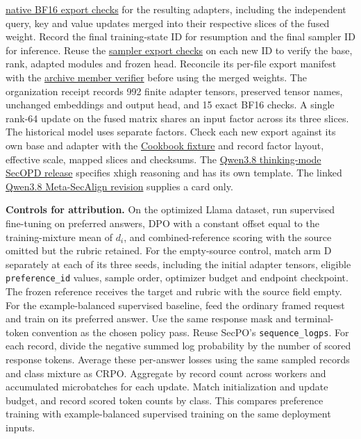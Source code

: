 \documentclass[11pt]{article}
\begin{document}
\href{https://huggingface.co/promptinjections/Qwen3.8-27B-SecPO-lr8e-5/blob/24d2b8a7b2166c607d4f1e0f1e13bbf8a9d555d7/merge_validation.json}{native BF16 export checks} for the resulting adapters, including the independent query, key and value updates merged into their respective slices of the fused weight. Record the final training-state ID for resumption and the final sampler ID for inference. Reuse the \href{https://github.com/0315jaewon/SecPO-test/blob/42280080f0f9224717f40a53928a761e554e1db0/scripts/export_tinker_for_lambda.py#L26-L59}{sampler export checks} on each new ID to verify the base, rank, adapted modules and frozen head. Reconcile its per-file export manifest with the \href{https://github.com/0315jaewon/SecPO-test/blob/42280080f0f9224717f40a53928a761e554e1db0/scripts/preserve_tinker_checkpoints.py#L35-L57}{archive member verifier} before using the merged weights. The organization receipt records 992 finite adapter tensors, preserved tensor names, unchanged embeddings and output head, and 15 exact BF16 checks. A single rank-64 update on the fused matrix shares an input factor across its three slices. The historical model uses separate factors. Check each new export against its own base and adapter with the \href{https://github.com/thinking-machines-lab/tinker-cookbook/blob/dfe4d77e8e8c7df7e9cd9539220b54a01d1eaa40/tests/weights/test_adapter_qwen3_5.py#L124-L188}{Cookbook fixture} and record factor layout, effective scale, mapped slices and checksums. The \href{https://huggingface.co/Sizhe-Chen/Qwen3.8-27B-Thinking-SecOPD/tree/eec051f39523a1f49f7920ad62674bbcbb08486c}{Qwen3.8 thinking-mode SecOPD release} specifies xhigh reasoning and has its own template. The linked \href{https://huggingface.co/Sizhe-Chen/Qwen3.8-27B-Instruct-MetaSecAlign/tree/52f3008aa9a96003eea573f581d3991e0f6bc443}{Qwen3.8 Meta-SecAlign revision} supplies a card only.

\textbf{Controls for attribution.} On the optimized Llama dataset, run supervised fine-tuning on preferred answers, DPO with a constant offset equal to the training-mixture mean of $d_i$, and combined-reference scoring with the source omitted but the rubric retained. For the empty-source control, match arm D separately at each of its three seeds, including the initial adapter tensors, eligible \texttt{preference\_id} values, sample order, optimizer budget and endpoint checkpoint. The frozen reference receives the target and rubric with the source field empty. For the example-balanced supervised baseline, feed the ordinary framed request and train on its preferred answer. Use the same response mask and terminal-token convention as the chosen policy pass. Reuse SecPO's \texttt{sequence\_logps}. For each record, divide the negative summed log probability by the number of scored response tokens. Average these per-answer losses using the same sampled records and class mixture as CRPO. Aggregate by record count across workers and accumulated microbatches for each update. Match initialization and update budget, and record scored token counts by class. This compares preference training with example-balanced supervised training on the same deployment inputs.
\end{document}
